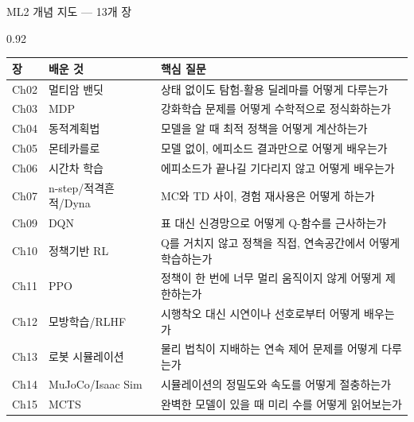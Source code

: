 \begin{frame}{ML2 개념 지도 — 13개 장}
\begin{center}\begin{varwidth}{0.92\textwidth}
  \small
  \begin{tabular}{@{}llp{}@{}}
    \toprule
    장 & 배운 것 & 핵심 질문 \\
    \midrule
    Ch02 & 멀티암 밴딧 & 상태 없이도 탐험-활용 딜레마를 어떻게
    다루는가 \\
    Ch03 & MDP & 강화학습 문제를 어떻게 수학적으로 정식화하는가 \\
    Ch04 & 동적계획법 & 모델을 알 때 최적 정책을 어떻게 계산하는가 \\
    Ch05 & 몬테카를로 & 모델 없이, 에피소드 결과만으로 어떻게 배우는가 \\
    Ch06 & 시간차 학습 & 에피소드가 끝나길 기다리지 않고 어떻게
    배우는가 \\
    Ch07 & n-step/적격흔적/Dyna & MC와 TD 사이, 경험 재사용은 어떻게
    하는가 \\
    Ch09 & DQN & 표 대신 신경망으로 어떻게 Q-함수를 근사하는가 \\
    Ch10 & 정책기반 RL & Q를 거치지 않고 정책을 직접, 연속공간에서
    어떻게 학습하는가 \\
    Ch11 & PPO & 정책이 한 번에 너무 멀리 움직이지 않게 어떻게
    제한하는가 \\
    Ch12 & 모방학습/RLHF & 시행착오 대신 시연이나 선호로부터 어떻게
    배우는가 \\
    Ch13 & 로봇 시뮬레이션 & 물리 법칙이 지배하는 연속 제어 문제를
    어떻게 다루는가 \\
    Ch14 & MuJoCo/Isaac Sim & 시뮬레이션의 정밀도와 속도를 어떻게
    절충하는가 \\
    Ch15 & MCTS & 완벽한 모델이 있을 때 미리 수를 어떻게
    읽어보는가 \\
    \bottomrule
  \end{tabular}
\end{varwidth}\end{center}
\end{frame}
